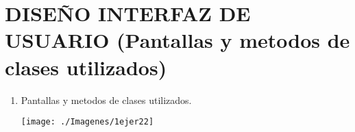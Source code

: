 \section{ DISEÑO INTERFAZ DE USUARIO (Pantallas y metodos de clases utilizados)} 

\begin{enumerate}[1.]
	\item Pantallas y metodos de clases utilizados.
    


	\begin{center}
	\texttt{[image: ./Imagenes/1ejer22]} 
	\end{center}

\end{enumerate} 